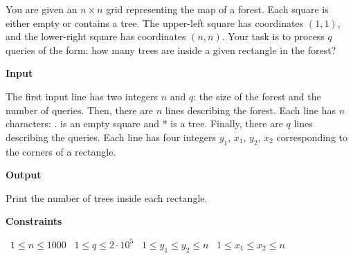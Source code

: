 You are given an $n \times n$ grid representing the map of a forest. Each square is either empty or contains a tree. The upper-left square has coordinates $(1,1)$, and the lower-right square has coordinates $(n,n)$.
Your task is to process $q$ queries of the form: how many trees are inside a given rectangle in the forest?

\vspace{0.3cm}\noindent\textbf{Input}

The first input line has two integers $n$ and $q$: the size of the forest and the number of queries.
Then, there are $n$ lines describing the forest. Each line has $n$ characters: . is an empty square and * is a tree.
Finally, there are $q$ lines describing the queries. Each line has four integers $y_1$, $x_1$, $y_2$, $x_2$ corresponding to the corners of a rectangle.

\vspace{0.3cm}\noindent\textbf{Output}

Print the number of trees inside each rectangle.

\vspace{0.3cm}\noindent\textbf{Constraints}

\textbullet\ $1 \le n \le 1000$
\textbullet\ $1 \le q \le 2 \cdot 10^5$
\textbullet\ $1 \le y_1 \le y_2 \le n$
\textbullet\ $1 \le x_1 \le x_2 \le n$